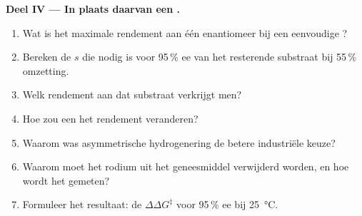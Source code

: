 \begin{problem}
\medskip\noindent\textbf{Deel IV --- In plaats daarvan een .}
\begin{enumerate}[resume]
  \item Wat is het maximale rendement aan één enantiomeer bij een
        eenvoudige ?
  \item Bereken de $s$ die nodig is voor 95\,\% ee van het resterende substraat bij 55\,\% omzetting.
  \item Welk rendement aan dat substraat verkrijgt men?
  \item Hoe zou een  het rendement
        veranderen?
  \item Waarom was asymmetrische hydrogenering de betere industriële
        keuze?
  \item Waarom moet het rodium uit het geneesmiddel verwijderd worden, en
        hoe wordt het gemeten?
  \item Formuleer het resultaat: de $\Delta\Delta G^\ddagger$ voor 95\,\% ee bij \qty{25}{\celsius}.
\end{enumerate}
\end{problem}
